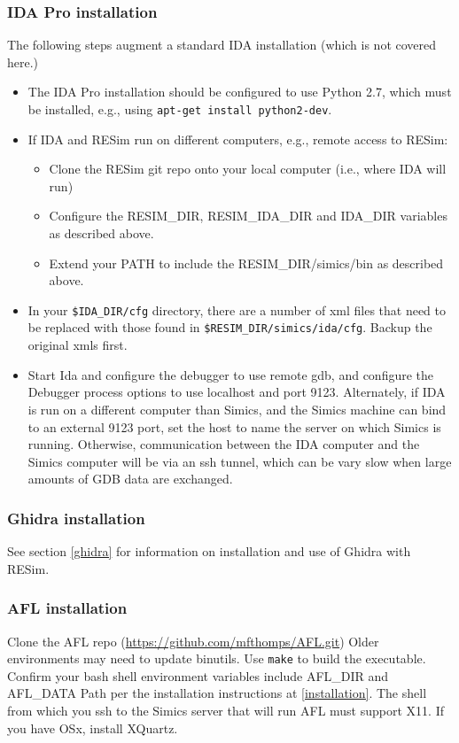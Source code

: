 \documentclass[titlepage]{article}
\begin{document}
\subsubsection{IDA Pro installation}
\label{ida-install}
The following steps augment a standard IDA installation (which is not covered here.)
\begin{itemize}
\item The IDA Pro installation should be configured to use Python 2.7, which must be
installed, e.g., using {\tt apt-get install python2-dev}.
\item If IDA and RESim run on different computers, e.g., remote access to RESim: 
\begin{itemize}
\item Clone the RESim git repo onto your local computer (i.e., where IDA will run)
\item Configure the RESIM\_DIR, RESIM\_IDA\_DIR and
IDA\_DIR variables as described above.  
\item Extend your PATH to include the RESIM\_DIR/simics/bin as described above.
\end{itemize}

\item In your {\tt \$IDA\_DIR/cfg} directory, there are a number of xml files that need to be replaced with those found
in {\tt \$RESIM\_DIR/simics/ida/cfg}.  Backup the original xmls first.

\item Start Ida and configure the debugger to use remote gdb, and configure the Debugger process options to use localhost and port 9123.  Alternately,
if IDA is run on a different computer than Simics, and the Simics machine can bind to an external 9123 port, set the host to name the server
on which Simics is running.  Otherwise, communication between the IDA computer and the Simics computer will be via an ssh tunnel, which can be vary slow
when large amounts of GDB data are exchanged.

\end{itemize}
\subsubsection{Ghidra installation}
See section \ref{ghidra} for information on installation and use of Ghidra with RESim.

\subsubsection{AFL installation}
Clone the AFL repo (\url{https://github.com/mfthomps/AFL.git})   Older environments may need to update binutils. Use {\tt make} to build the executable.
Confirm your bash shell environment variables include AFL\_DIR and AFL\_DATA Path per the installation instructions at \ref{installation}.
The shell from which you ssh to the Simics server that will run AFL must support X11.  If you have OSx, install XQuartz.
\end{document}
